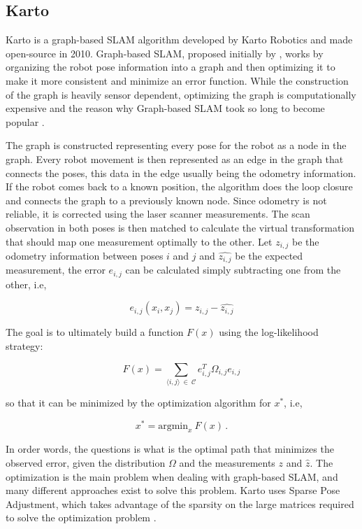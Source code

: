\subsection{Karto}

Karto is a graph-based SLAM algorithm developed by Karto Robotics and made open-source in 2010. Graph-based SLAM, proposed initially by \citeauthor{lu1997globally}, works by organizing the robot pose information into a graph and then optimizing it to make it more consistent and minimize an error function. While the construction of the graph is heavily sensor dependent, optimizing the graph is computationally expensive and the reason why Graph-based SLAM took so long to become popular \cite{grisetti2010tutorial}.

The graph is constructed representing every pose for the robot as a node in the graph. Every robot movement is then represented as an edge in the graph that connects the poses, this data in the edge usually being the odometry information. If the robot comes back to a known position, the algorithm does the loop closure and connects the graph to a previously known node. Since odometry is not reliable, it is corrected using the laser scanner measurements. The scan observation in both poses is then matched to calculate the virtual transformation that should map one measurement optimally to the other. Let $z_{i,j}$ be the odometry information between poses $i$ and $j$ and $\hat{z_{i,j}}$ be the expected measurement, the error $e_{i,j}$ can be calculated simply subtracting one from the other, i.e,

\begin{equation}
    e_{i,j}(x_i, x_j) = z_{i,j} - \hat{z_{i,j}}
\end{equation}

The goal is to ultimately build a function $F(x)$ using the log-likelihood strategy:

\begin{equation}
    F(x) = \sum_{\langle i, j \rangle \ \in \ \mathcal{C}} e_{i,j}^T \Omega_{i,j} e_{i,j}
\end{equation}

\noindent so that it can be minimized by the optimization algorithm for $x^*$, i.e, 

\begin{equation}
    x^* = \text{argmin}_x \ F(x) \,.
\end{equation}

In order words, the questions is what is the optimal path that minimizes the observed error, given the distribution $\Omega$ and the measurements $z$ and $\hat{z}$. The optimization is the main problem when dealing with graph-based SLAM, and many different approaches exist to solve this problem. Karto uses Sparse Pose Adjustment, which takes advantage of the sparsity on the large matrices required to solve the optimization problem \cite{konolige2010efficient}.

